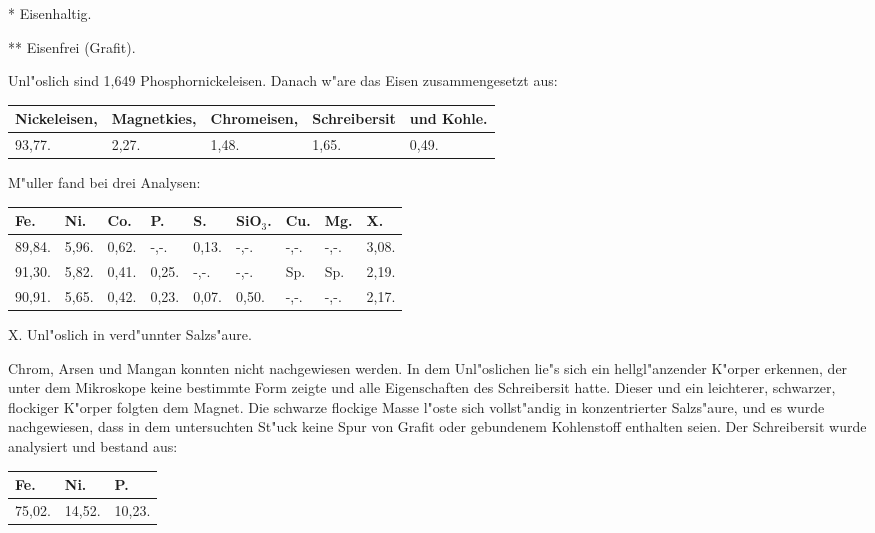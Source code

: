 \documentclass[a4paper, 11pt, oneside]{article}
\begin{document}
* Eisenhaltig.

** Eisenfrei (Grafit).

Unl"oslich sind 1,649 Phosphornickeleisen. Danach w"are das Eisen zusammengesetzt aus:
\begin{table}[H]
    \centering\swabfamily\Large
    \begin{tabular}{l l l l l}
        Nickeleisen, & Magnetkies, & Chromeisen, & Schreibersit & und Kohle. \\ \hline
        93,77. & 2,27. & 1,48. & 1,65. & 0,49. \\
    \end{tabular}
\end{table}

M"uller fand bei drei Analysen:
\begin{table}[H]
    \centering\swabfamily\Large
    \begin{tabular}{l l l l l l l l l}
        Fe. & Ni. & Co. & P. & S. & SiO$_{3}$. & Cu. & Mg. & X. \\ \hline
        89,84. & 5,96. & 0,62. & -,-. & 0,13. & -,-. & -,-. & -,-. & 3,08. \\
        91,30. & 5,82. & 0,41. & 0,25. & -,-. & -,-. & Sp. & Sp. & 2,19. \\
        90,91. & 5,65. & 0,42. & 0,23. & 0,07. & 0,50. & -,-. & -,-. & 2,17. \\
    \end{tabular}
\end{table}

X. Unl"oslich in verd"unnter Salzs"aure.

Chrom, Arsen und Mangan konnten nicht nachgewiesen werden. In dem Unl"oslichen lie"s sich ein hellgl"anzender K"orper erkennen, der unter dem Mikroskope keine bestimmte Form zeigte und alle Eigenschaften des Schreibersit hatte. Dieser und ein leichterer, schwarzer, flockiger K"orper folgten dem Magnet. Die schwarze flockige Masse l"oste sich vollst"andig in konzentrierter Salzs"aure, und es wurde nachgewiesen, dass in dem untersuchten St"uck keine Spur von Grafit oder gebundenem Kohlenstoff enthalten seien. Der Schreibersit wurde analysiert und bestand aus:
\begin{table}[H]
    \centering\swabfamily\Large
    \begin{tabular}{l l l}
        Fe. & Ni. & P. \\ \hline
        75,02. & 14,52. & 10,23. \\
    \end{tabular}
\end{table}
\end{document}
